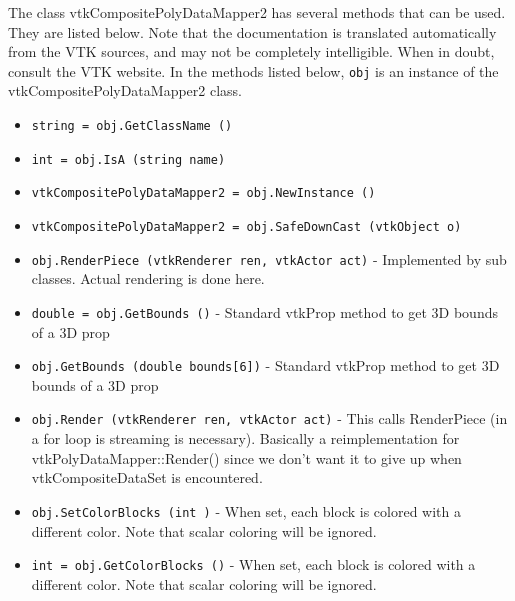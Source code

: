 The class vtkCompositePolyDataMapper2 has several methods that can be used.
  They are listed below.
Note that the documentation is translated automatically from the VTK sources,
and may not be completely intelligible.  When in doubt, consult the VTK website.
In the methods listed below, \verb|obj| is an instance of the vtkCompositePolyDataMapper2 class.
\begin{itemize}
\item  \verb|string = obj.GetClassName ()|

\item  \verb|int = obj.IsA (string name)|

\item  \verb|vtkCompositePolyDataMapper2 = obj.NewInstance ()|

\item  \verb|vtkCompositePolyDataMapper2 = obj.SafeDownCast (vtkObject o)|

\item  \verb|obj.RenderPiece (vtkRenderer ren, vtkActor act)| -  Implemented by sub classes. Actual rendering is done here.

\item  \verb|double = obj.GetBounds ()| -  Standard vtkProp method to get 3D bounds of a 3D prop

\item  \verb|obj.GetBounds (double bounds[6])| -  Standard vtkProp method to get 3D bounds of a 3D prop

\item  \verb|obj.Render (vtkRenderer ren, vtkActor act)| -  This calls RenderPiece (in a for loop is streaming is necessary).
 Basically a reimplementation for vtkPolyDataMapper::Render() since we don't
 want it to give up when vtkCompositeDataSet is encountered.

\item  \verb|obj.SetColorBlocks (int )| -  When set, each block is colored with a different color. Note that scalar
 coloring will be ignored.

\item  \verb|int = obj.GetColorBlocks ()| -  When set, each block is colored with a different color. Note that scalar
 coloring will be ignored.

\end{itemize}
